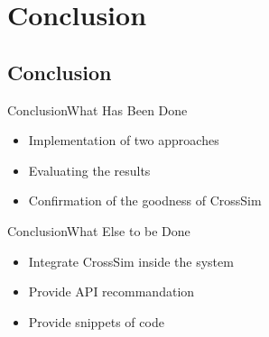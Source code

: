 \documentclass{beamer}
\begin{document}
\section{Conclusion}
\subsection{Conclusion}

\begin{frame}{Conclusion}{What Has Been Done}
	\begin{itemize}
		\item Implementation of two approaches
		\item Evaluating the results
		\item Confirmation of the goodness of CrossSim
	\end{itemize}
\end{frame}

\begin{frame}{Conclusion}{What Else to be Done}
	\begin{itemize}
		\item Integrate CrossSim inside the system
		\item Provide API recommandation
		\item Provide snippets of code
	\end{itemize}
\end{frame}
\end{document}
